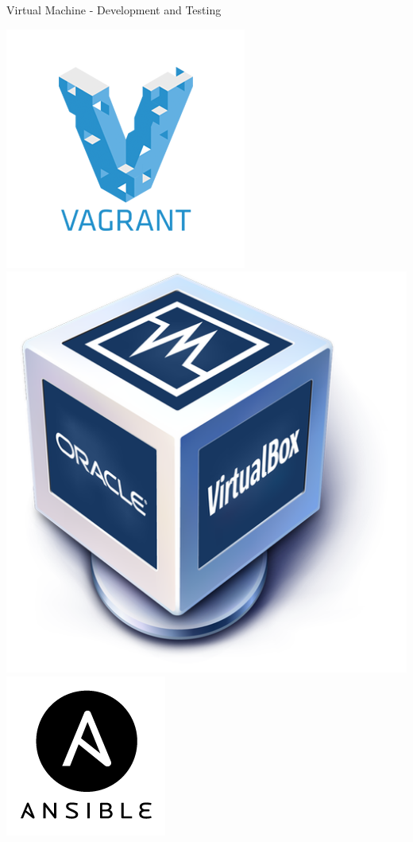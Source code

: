 \documentclass[12pt]{beamer}
\begin{document}
\begin{frame}[fragile]{Virtual Machine - Development and Testing}
	\begin{center}
		\includegraphics[keepaspectratio=true,height=0.35\textheight]{images/vagrant.png}
		\includegraphics[keepaspectratio=true,height=0.35\textheight]{images/virtualbox.png}
		\includegraphics[keepaspectratio=true,height=0.35\textheight]{images/ansible.png}
	\end{center}


\end{frame}
\end{document}
